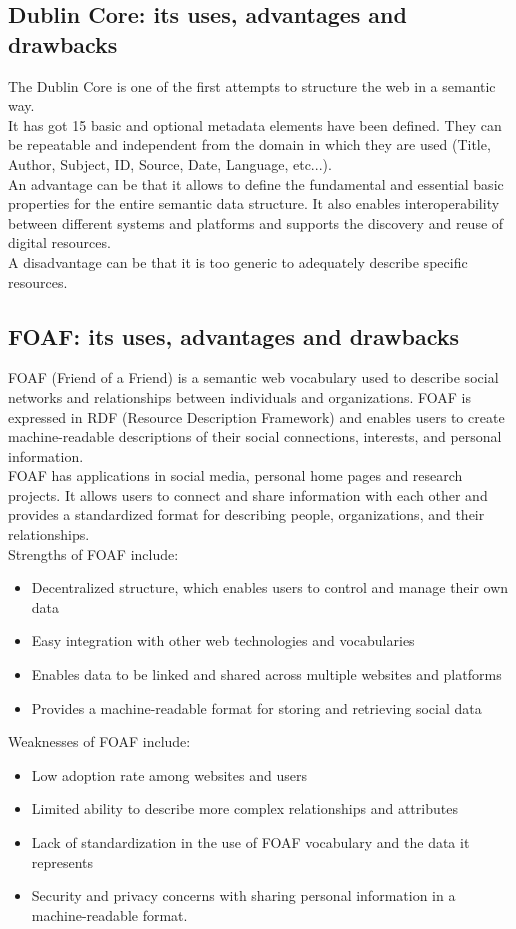 \subsection{Dublin Core: its uses, advantages and drawbacks}
The Dublin Core is one of the first attempts to structure the web
in a semantic way.\\
It has got 15 basic and optional metadata elements have been defined.
They can be repeatable and independent from the domain in which they
are used (Title, Author, Subject, ID, Source, Date, Language, etc...).\\
An advantage can be that it allows to define the fundamental and
essential basic properties for the entire semantic data structure.
It also enables interoperability between different systems and platforms
and supports the discovery and reuse of digital resources.\\
A disadvantage can be that it is too generic to adequately describe
specific resources.

\subsection{FOAF: its uses, advantages and drawbacks}
FOAF (Friend of a Friend) is a semantic web vocabulary
used to describe social networks and relationships between individuals
and organizations. FOAF is expressed in RDF (Resource Description
Framework) and enables users to create machine-readable descriptions
of their social connections, interests, and personal information.\\
FOAF has applications in social media, personal home pages and
research projects. It allows users to connect and share information
with each other and provides a standardized format for describing
people, organizations, and their relationships.\\
Strengths of FOAF include:
\begin{itemize}
    \item Decentralized structure, which enables users to control and manage their own data
    \item Easy integration with other web technologies and vocabularies
    \item Enables data to be linked and shared across multiple websites
    and platforms
    \item Provides a machine-readable format for storing and retrieving
    social data
\end{itemize}
Weaknesses of FOAF include:
\begin{itemize}
    \item Low adoption rate among websites and users
    \item Limited ability to describe more complex relationships and
    attributes
    \item Lack of standardization in the use of FOAF vocabulary and
    the data it represents
    \item Security and privacy concerns with sharing personal
    information in a machine-readable format.
\end{itemize}

